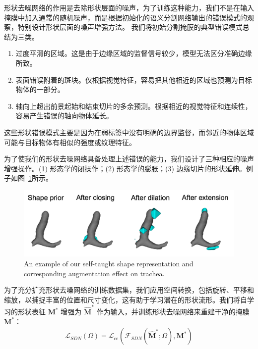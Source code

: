 形状去噪网络的作用是去除形状层面的噪声，为了训练这种能力，我们不是在输入掩膜中加入通常的随机噪声，而是根据初始化的语义分割网络输出的错误模式的观察，特别设计形状层面的噪声增强方法。
我们将初始分割掩膜的典型错误模式总结为三类。
\begin{enumerate}
    \item 过度平滑的区域。这是由于边缘区域的监督信号较少，模型无法区分准确边缘所致。
    \item 表面错误附着的斑块。仅根据视觉特征，容易把其他相近的区域也预测为目标物体的一部分。
    \item 轴向上超出前景起始和结束切片的多余预测。根据相近的视觉特征和连续性，容易产生错误的轴向物体延长。
\end{enumerate}
这些形状错误模式主要是因为在弱标签中没有明确的边界监督，而邻近的物体区域可能与目标物体有相似的强度或纹理特征。

为了使我们的形状去噪网络具备处理上述错误的能力，我们设计了三种相应的噪声增强操作。(1) 形态学的闭操作；(2) 形态学的膨胀；(3) 边缘切片的形状延伸。例子如图~\ref{fig:shape_aug}所示。
    \begin{figure}[tbp]
        \centering 
        \includegraphics[width=1.0\textwidth]{img/c3/b_shape_aug2.png}
        {An example of our self-taught shape representation and corresponding augmentation effect on trachea.}
        \label{fig:shape_aug}
    \end{figure}
为了充分扩充形状去噪网络的训练数据集，我们应用空间转换，包括旋转、平移和缩放，以捕捉丰富的位置和尺寸变化，这有助于学习潜在的形状流形。我们将自学习的形状表征 $\mathbf{M}^*$ 增强为 $\mathbf{\hat{M}}^*$ 作为输入，并训练形状去噪网络来重建干净的掩膜 $\mathbf{M}^*$：
\begin{align}
    \mathcal{L}_{SDN} (\Omega) = \mathcal{L}_{ce} (\mathcal{F}_{SDN} (\mathbf{\hat{M}}^*; \Omega), \mathbf{M}^*)
\end{align}


